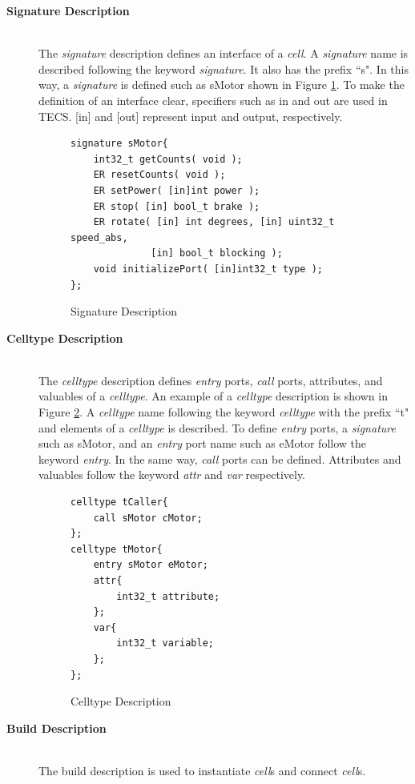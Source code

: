 \documentclass{sig-alternate-05-2015}
\begin{document}
\begin{description}
    \item[{\bf Signature Description}]\mbox{}\\
        The {\it signature} description defines an interface of a {\it cell}.
        A {\it signature} name is described following the keyword {\it signature}.
        It also has the prefix ``s".
        In this way, a {\it signature} is defined such as sMotor shown in Figure \ref{signature}.
        To make the definition of an interface clear, specifiers such as in and out are used in TECS.
        [in] and [out] represent input and output, respectively.
\begin{figure}[t]
\centering
\begin{lstlisting}
signature sMotor{
    int32_t getCounts( void );
    ER resetCounts( void );
    ER setPower( [in]int power );
    ER stop( [in] bool_t brake );
    ER rotate( [in] int degrees, [in] uint32_t speed_abs,
              [in] bool_t blocking );
    void initializePort( [in]int32_t type );
};
\end{lstlisting}
\caption{Signature Description}
\label{signature}
\end{figure}
    \item[{\bf Celltype Description}]\mbox{}\\
        The {\it celltype} description defines {\it entry} ports, {\it call} ports, attributes, and valuables of a {\it celltype}.
        An example of a {\it celltype} description is shown in Figure \ref{celltype}.
        A {\it celltype} name following the keyword {\it celltype} with the prefix ``t" and elements of a {\it celltype} is described.
        To define {\it entry} ports, a {\it signature} such as sMotor, and an {\it entry} port name such as eMotor follow the keyword {\it entry}.
        In the same way, {\it call} ports can be defined.
        Attributes and valuables follow the keyword {\it attr} and {\it var} respectively.
\begin{figure}[t]
\centering
\begin{lstlisting}
celltype tCaller{
    call sMotor cMotor;
};
celltype tMotor{
    entry sMotor eMotor;
    attr{
        int32_t attribute;
    };
    var{
        int32_t variable;
    };
};
\end{lstlisting}
\caption{Celltype Description}
\label{celltype}
\end{figure}
    \item[{\bf Build Description}]\mbox{}\\
        The build description is used to instantiate {\it cell}s and connect {\it cell}s.

\end{description}
\end{document}
